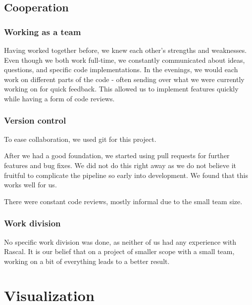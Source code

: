 \documentclass{article}
\begin{document}
\subsection{Cooperation}
\subsubsection{Working as a team}
Having worked together before, we knew each other's strengths and weaknesses. Even though we both work full-time, we constantly communicated about ideas, questions, and specific code implementations. 
In the evenings, we would each work on different parts of the code - often sending over what we were currently working on for quick feedback. This allowed us to implement features quickly while having a form of code reviews.

\subsubsection{Version control}
To ease collaboration, we used git for this project.

After we had a good foundation, we started using pull requests for further features and bug fixes. We did not do this right away as we do not believe it fruitful to complicate the pipeline so early into development. We found that this works well for us.

There were constant code reviews, mostly informal due to the small team size.

\subsubsection{Work division}
No specific work division was done, as neither of us had any experience with Rascal. It is our belief that on a project of smaller scope with a small team, working on a bit of everything leads to a better result.




\clearpage
\appendix
\appendixpage{}

\section{Visualization}
\label{appendix:visualization}
\end{document}
